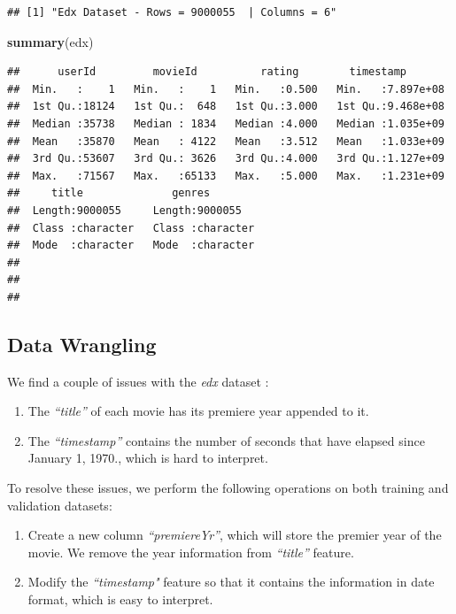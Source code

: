 \documentclass[]{article}
\newenvironment{Shaded}{\begin{snugshade}}{\end{snugshade}}
\newcommand{\KeywordTok}[1]{\textcolor[rgb]{0.13,0.29,0.53}{\textbf{#1}}}
\newcommand{\NormalTok}[1]{#1}
\begin{document}
\begin{verbatim}
## [1] "Edx Dataset - Rows = 9000055  | Columns = 6"
\end{verbatim}

\begin{Shaded}
\begin{Highlighting}[]
\KeywordTok{summary}\NormalTok{(edx)}
\end{Highlighting}
\end{Shaded}

\begin{verbatim}
##      userId         movieId          rating        timestamp        
##  Min.   :    1   Min.   :    1   Min.   :0.500   Min.   :7.897e+08  
##  1st Qu.:18124   1st Qu.:  648   1st Qu.:3.000   1st Qu.:9.468e+08  
##  Median :35738   Median : 1834   Median :4.000   Median :1.035e+09  
##  Mean   :35870   Mean   : 4122   Mean   :3.512   Mean   :1.033e+09  
##  3rd Qu.:53607   3rd Qu.: 3626   3rd Qu.:4.000   3rd Qu.:1.127e+09  
##  Max.   :71567   Max.   :65133   Max.   :5.000   Max.   :1.231e+09  
##     title              genres         
##  Length:9000055     Length:9000055    
##  Class :character   Class :character  
##  Mode  :character   Mode  :character  
##                                       
##                                       
## 
\end{verbatim}

\subsection{Data Wrangling}
\label{sec:dw}

We find a couple of issues with the \emph{edx} dataset :

\begin{enumerate}
\item The \emph{``title''} of each movie has its premiere year appended to it.
\item The \emph{``timestamp''} contains the number of seconds that have elapsed since January 1, 1970., which is hard to interpret.
\end{enumerate}

To resolve these issues, we perform the following operations on both
training and validation datasets:

\begin{enumerate}
\item Create a new column \emph{``premiereYr''}, which will store the premier year of the movie. We remove the year information from \emph{``title''} feature.
\item Modify the \emph{``timestamp"} feature so that it contains the information in date format, which is easy to interpret. 
\end{enumerate}
\end{document}
